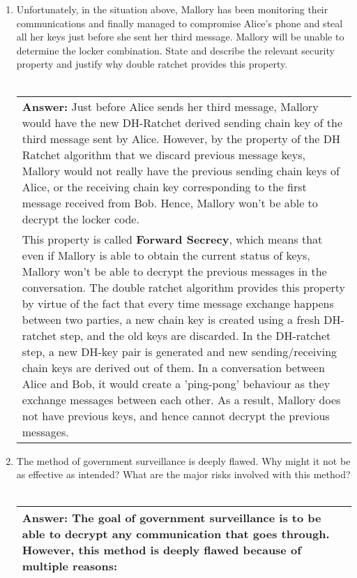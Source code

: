 \documentclass[11pt]{article}
\newenvironment{answer}
{\vspace{2mm}\begin{tabular}{|p{0.9\textwidth}|}
 \hline{\bf Answer:} }{\\ \hline\end{tabular}\vspace{1cm}}
\newenvironment{problems}
{\begin{enumerate}[label=\bfseries Question \arabic*.,align=left,leftmargin=1em,labelwidth=1.5em]}
{\end{enumerate}}
\begin{document}
\begin{problems}
\begin{answer}
Since Alice sends at most 2 consecutive messages, Alice's longest sending chain is of length 2. Since Bob sends at most 1 consecutive message, Bob's sending chain is of length 1.
\end{answer}
\item Unfortunately, in the situation above, Mallory has been monitoring their communications and finally managed to compromise Alice’s phone and steal all her keys just before she sent her third message. Mallory will be unable to determine the locker combination. State and describe the relevant security property and justify why double ratchet provides this property.
\\ \\
\begin{answer}
Just before Alice sends her third message, Mallory would have the new DH-Ratchet derived sending chain key of the third message sent by Alice. However, by the property of the DH Ratchet algorithm that we discard previous message keys, Mallory would not really have the previous sending chain keys of Alice, or the receiving chain key corresponding to the first message received from Bob. Hence, Mallory won't be able to decrypt the locker code.

\\
This property is called \textbf{Forward Secrecy}, which means that even if Mallory is able to obtain the current status of keys, Mallory won't be able to decrypt the previous messages in the conversation. The double ratchet algorithm provides this property by virtue of the fact that every time message exchange happens between two parties, a new chain key is created using a fresh DH-ratchet step, and the old keys are discarded. In the DH-ratchet step, a new DH-key pair is generated and new sending/receiving chain keys are derived out of them. In a conversation between Alice and Bob, it would create a 'ping-pong' behaviour as they exchange messages between each other. As a result, Mallory does not have previous keys, and hence cannot decrypt the previous messages. 
\end{answer}
\item The method of government surveillance is deeply flawed. Why might it not be as effective as intended? What are the major risks involved with this method?
\\ \\
\begin{answer}
The goal of government surveillance is to be able to decrypt any communication that goes through. However, this method is deeply flawed because of multiple reasons:


\end{answer}
\end{problems}
\end{document}
